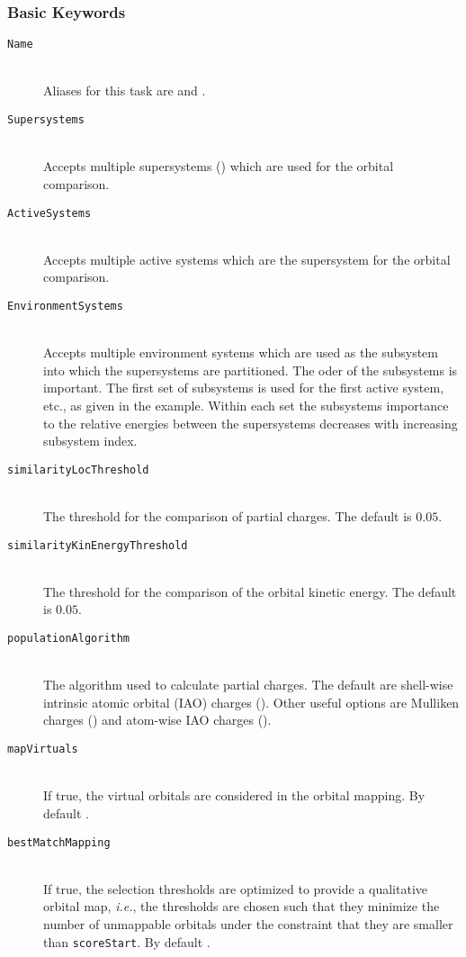 \subsubsection{Basic Keywords}
\begin{description}
 \item [\texttt{Name}]\hfill \\
 Aliases for this task are  and .
 \item [\texttt{Supersystems}]\hfill \\
 Accepts multiple supersystems () which are used for the orbital comparison.
 \item [\texttt{ActiveSystems}]\hfill \\
 Accepts multiple active systems which are the supersystem for the orbital comparison.
 \item [\texttt{EnvironmentSystems}]\hfill \\
 Accepts multiple environment systems which are used as the subsystem into which the
 supersystems are partitioned. The oder of the subsystems is important. The
 first set of subsystems is used for the first active system, etc., as given in the
 example. Within each set the subsystems importance to the relative energies between
 the supersystems decreases with increasing subsystem index.
 \item [\texttt{similarityLocThreshold}]\hfill \\
 The threshold for the comparison of partial charges. The default is ${0.05}$.
 \item [\texttt{similarityKinEnergyThreshold}]\hfill \\
 The threshold for the comparison of the orbital kinetic energy. The default is ${0.05}$.
 \item [\texttt{populationAlgorithm}]\hfill \\
 The algorithm used to calculate partial charges. The default are shell-wise intrinsic atomic orbital (IAO)
 charges (). Other useful options are Mulliken charges () and atom-wise IAO
 charges ().
 \item [\texttt{mapVirtuals}]\hfill \\
 If true, the virtual orbitals are considered in the orbital mapping. By default .
 \item [\texttt{bestMatchMapping}]\hfill \\
 If true, the selection thresholds are optimized to provide a qualitative orbital map, \emph{i.e.},
 the thresholds are chosen such that they minimize the number of unmappable orbitals
 under the constraint that they are smaller than \texttt{scoreStart}. By default .
\end{description}
